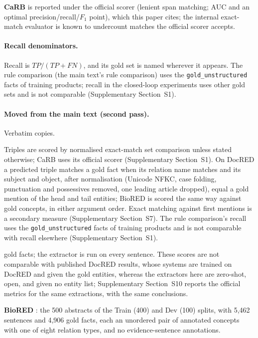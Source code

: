 \documentclass[11pt]{article}
\begin{document}
\textbf{CaRB} is reported under the official scorer (lenient span
matching; AUC and an optimal precision/recall/$F_1$ point), which this
paper cites; the internal exact-match evaluator is known to undercount
matches the official scorer accepts.

\paragraph{Recall denominators.} Recall is $TP/(TP+FN)$, and its gold
set is named wherever it appears. The rule comparison
(the main text's rule comparison) uses the
\texttt{gold\_unstructured} facts of training products; recall in the
closed-loop experiments uses other gold sets and is not comparable
(Supplementary Section~S1).


\paragraph{Moved from the main text (second pass).} Verbatim copies.

Triples are scored by normalised exact-match set comparison unless
stated otherwise; CaRB uses its official scorer (Supplementary
Section~S1). On DocRED a predicted triple matches a gold fact when its
relation name matches and its subject and object, after normalisation
(Unicode NFKC, case folding, punctuation and possessives removed, one
leading article dropped), equal a gold mention of the head and tail
entities; BioRED is scored the same way against gold concepts, in either
argument order. Exact matching against first mentions is a secondary
measure (Supplementary Section~S7). The rule comparison's recall uses
the \texttt{gold\_unstructured} facts of training products and is not
comparable with recall elsewhere (Supplementary Section~S1).

gold facts; the extractor is run on every sentence. These scores are not
comparable with published DocRED results, whose systems are trained on
DocRED and given the gold entities, whereas the extractors here are
zero-shot, open, and given no entity list; Supplementary Section~S10
reports the official metrics for the same extractions, with the same
conclusions.

\textbf{BioRED} \citep{luo2022biored}: the 500 abstracts of the Train
(400) and Dev (100) splits, with 5,462 sentences and 4,906 gold facts,
each an unordered pair of annotated concepts with one of eight relation
types, and no evidence-sentence annotations.
\end{document}
